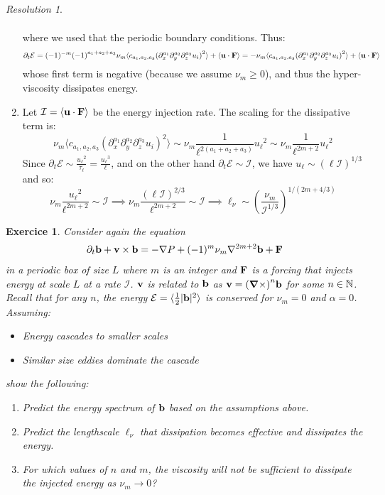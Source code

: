 \documentclass[10pt,a4paper]{article}
\newtheorem{exercici}{Exercice}
\theoremstyle{definition}
\theoremstyle{remark}
\newtheorem*{res}{Resolution}
\begin{document}
\begin{res}
\begin{enumerate}
\begin{align*}
          \end{align*}
          where we used that the periodic boundary conditions. Thus:
          $$
            \partial_t\mathcal{E}= (-1)^{-m}{(-1)}^{a_1+a_2+a_3}\nu_m \langle c_{a_1,a_2,a_3}{(\partial_x^{a_1} \partial_y^{a_2} \partial_z^{a_3} u_i)}^2 \rangle + \langle \boldsymbol{\mathrm{u}} \cdot \boldsymbol{\mathrm{F}} \rangle= -\nu_m \langle c_{a_1,a_2,a_3}{(\partial_x^{a_1} \partial_y^{a_2} \partial_z^{a_3} u_i)}^2 \rangle + \langle \boldsymbol{\mathrm{u}} \cdot \boldsymbol{\mathrm{F}} \rangle
          $$
          whose first term is negative (because we assume $\nu_m\geq 0$), and thus the hyper-viscosity dissipates energy.
    \item Let $\mathcal{I}= \langle \boldsymbol{\mathrm{u}} \cdot \boldsymbol{\mathrm{F}} \rangle$ be the energy injection rate. The scaling for the dissipative term is:
          $$
            \nu_m \langle c_{a_1,a_2,a_3}{(\partial_x^{a_1} \partial_y^{a_2} \partial_z^{a_3} u_i)}^2 \rangle \sim \nu_m \frac{1}{\ell^{2(a_1+a_2+a_3)}} {u_{\ell}}^2 \sim \nu_m \frac{1}{\ell^{2m+2}} {u_{\ell}}^2
          $$
          Since $\partial_t \mathcal{E} \sim \frac{{u_\ell}^2}{\tau_\ell}=\frac{{u_\ell}^3}{\ell}$, and on the other hand $\partial_t \mathcal{E} \sim \mathcal{I}$, we have $u_\ell \sim {( \ell \mathcal{I})}^{1/3}$ and so:
          $$
            \nu_m \frac{{u_{\ell}}^2}{\ell^{2m+2}} \sim \mathcal{I} \implies
            \nu_m \frac{{( \ell \mathcal{I})}^{2/3}}{\ell^{2m+2}}\sim \mathcal{I} \implies
            \ell_\nu \sim \left(\frac{\nu_m}{\mathcal{I}^{1/3}}\right)^{1/(2m+4/3)}
          $$
  \end{enumerate}
\end{res}
\begin{exercici}
  Consider again the equation
  \begin{gather}
    \partial_t \boldsymbol{\mathrm{b}}+\boldsymbol{\mathrm{v}} \times \boldsymbol{\mathrm{b}} = -\nabla P + (-1)^m \nu_m \nabla^{2m+2} \boldsymbol{\mathrm{b}} + \boldsymbol{\mathrm{F}} \\
  \end{gather}
  in a periodic box of size $L$ where $m$ is an integer and $\boldsymbol{\mathrm{F}}$ is a forcing that injects energy at scale $L$ at a rate $\mathcal{I}$. $\boldsymbol{\mathrm{v}}$ is related to $\boldsymbol{\mathrm{b}}$ as $\boldsymbol{\mathrm{v}} = {(\operatorname{\boldsymbol{\mathrm{\nabla}}\times})}^n \boldsymbol{\mathrm{b}}$ for some $n \in \mathbb{N}$. Recall that for any $n$, the energy $\mathcal{E}= \langle \frac{1}{2} |\boldsymbol{\mathrm{b}}|^2 \rangle$ is conserved for $\nu_m = 0$ and $\alpha = 0$. Assuming:
  \begin{itemize}
    \item Energy cascades to smaller scales
    \item Similar size eddies dominate the cascade
  \end{itemize}
  show the following:
  \begin{enumerate}
    \item Predict the energy spectrum of $\boldsymbol{\mathrm{b}}$ based on the assumptions above.
    \item Predict the lengthscale $\ell_\nu$ that dissipation becomes effective and dissipates the energy.
    \item For which values of $n$ and $m$, the viscosity will not be sufficient to dissipate the injected energy as $\nu_m \to 0$?
  \end{enumerate}
\end{exercici}
\end{document}
